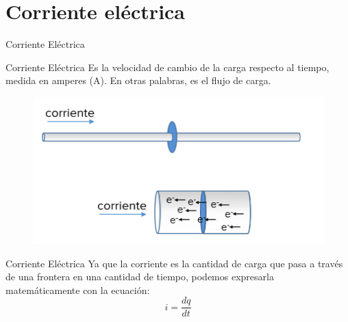 \documentclass[10pt]{beamer}
\begin{document}
\section{Corriente eléctrica}
\begin{frame}{Corriente Eléctrica}{}

\begin{block}{Corriente Eléctrica}
Es la velocidad de cambio de la carga respecto al tiempo, medida en amperes (A). En otras palabras, es el flujo de carga.
\end{block}
\medskip
\begin{figure}[h!]
\centering
\includegraphics [scale=0.45]{current}
\label{fig:first}
\end{figure}
\end{frame}

\begin{frame}{Corriente Eléctrica}{}
Ya que la corriente es la cantidad de carga que pasa a través de una frontera en una cantidad de tiempo, podemos expresarla matemáticamente con la ecuación:
\begin{equation}
    i = \frac{dq}{dt}
\end{equation}
\end{frame}
\end{document}
